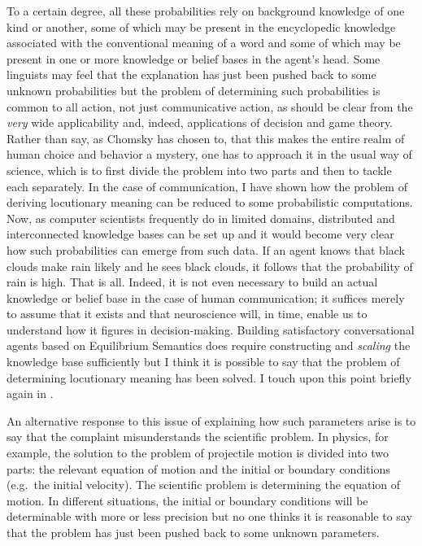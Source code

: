 To a certain degree, all these probabilities rely on background knowledge of one kind or another, some of which may be present in the encyclopedic knowledge associated with the conventional meaning of a word and some of which may be present in one or more knowledge or belief bases in the agent's head. Some linguists may feel that the explanation has just been pushed back to some unknown probabilities but the problem of determining such probabilities is common to all action, not just communicative action, as should be clear from the \emph{very} wide applicability and, indeed, applications of decision and game theory. Rather than say, as Chomsky has chosen to, that this makes the entire realm of human choice and behavior a mystery, one has to approach it in the usual way of science, which is to first divide the problem into two parts and then to tackle each separately. In the case of communication, I have shown how the problem of deriving locutionary meaning can be reduced to some probabilistic computations. Now, as computer scientists frequently do in limited domains, distributed and interconnected knowledge bases can be set up and it would become very clear how such probabilities can emerge from such data. If an agent knows that black clouds make rain likely and he sees black clouds, it follows that the probability of rain is high. That is all. Indeed, it is not even necessary to build an actual knowledge or belief base in the case of human communication; it suffices merely to assume that it exists and that neuroscience will, in time, enable us to understand how it figures in decision-making. Building satisfactory conversational agents based on Equilibrium Semantics does require constructing and \emph{scaling} the knowledge base sufficiently but I think it is possible to say that the problem of determining locutionary meaning has been solved. I touch upon this point briefly again in .

An alternative response to this issue of explaining how such parameters arise is to say that the complaint misunderstands the scientific problem. In physics, for example, the solution to the problem of projectile motion is divided into two parts: the relevant equation of motion and the initial or boundary conditions (e.g.\ the initial velocity). The scientific problem is determining the equation of motion. In different situations, the initial or boundary conditions will be determinable with more or less precision but no one thinks it is reasonable to say that the problem has just been pushed back to some unknown parameters.

